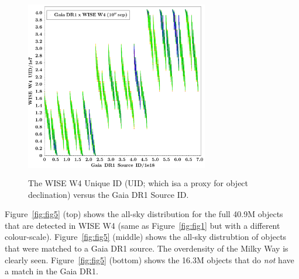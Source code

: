\documentclass[11pt,a4paper]{article}
\begin{document}
{{\begin{figure}
    \centering
    \includegraphics[height=8.0cm,width=8.0cm]
    {../../Gaia/plots/Gaia_sourceID_vs_WW4C_uid.png}
    \caption[The WISE W4 Unique ID (UID; which isa a proxy for object declination) versus the Gaia DR1 Source ID.]
    {The WISE W4 Unique ID (UID; which isa a proxy for object declination) versus the Gaia DR1 Source ID.}                    
    \label{fig:fig4}
\end{figure}



Figure~\ref{fig:fig5} (top) shows the all-sky distribution for the
full 40.9M objects that are detected in WISE W4 (same as
Figure~\ref{fig:fig1} but with a different
colour-scale). Figure~\ref{fig:fig5} (middle) shows the all-sky distrubtion of 
objects that were matched to a Gaia DR1 source. The overdensity of the Milky 
Way is clearly seen. Figure~\ref{fig:fig5} (bottom) shows the 16.3M objects 
that do {\it not} have a match in the Gaia DR1. 


}}
\end{document}
